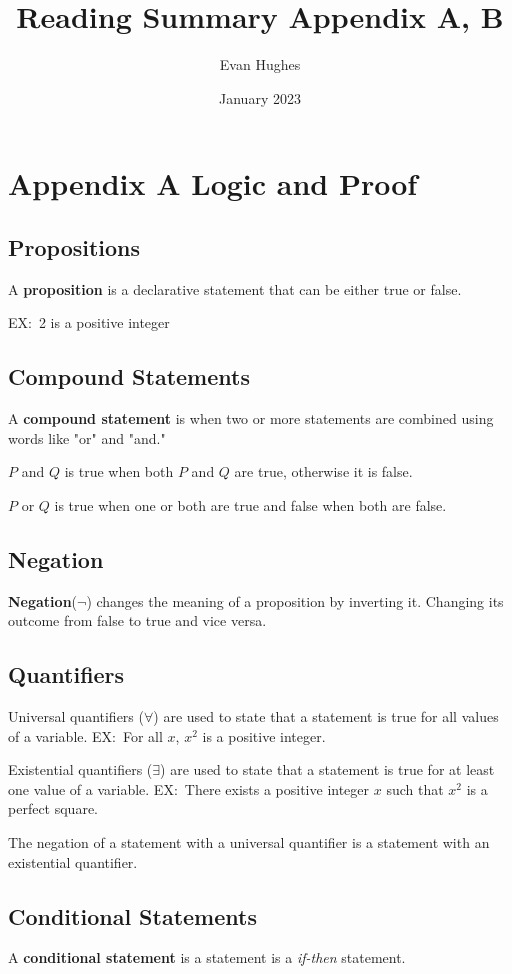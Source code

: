 \documentclass{article}
\title{Reading Summary Appendix A, B}
\author{Evan Hughes}
\date{January 2023}
\begin{document}
\maketitle
\section{Appendix A Logic and Proof}
\subsection*{Propositions}
A \textbf{proposition} is a declarative statement that can be either true or false.

EX$\colon$ 2 is a positive integer
\subsection*{Compound Statements}
A \textbf{compound statement} is when two or more statements are combined using words like "or" and "and."

$P$ and $Q$ is true when both $P$ and $Q$ are true, otherwise it is false.

$P$ or $Q$ is true when one or both are true and false when both are false.
\subsection*{Negation}
\textbf{Negation}($\lnot$) changes the meaning of a proposition by inverting it.
Changing its outcome from false to true and vice versa.

\subsection*{Quantifiers}
Universal quantifiers ($\forall$) are used to state that a statement is true for all values of a variable.
EX$\colon$ For all $x$, $x^2$ is a positive integer.


Existential quantifiers ($\exists$) are used to state that a statement is true for at least one value of a variable.
EX$\colon$ There exists a positive integer $x$ such that $x^2$ is a perfect square.


The negation of a statement with a universal quantifier
is a statement with an existential quantifier. 

\subsection*{Conditional Statements}
A \textbf{conditional statement} is a statement is a \emph{if-then} statement.
\end{document}
